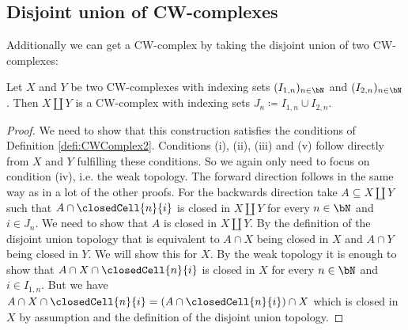 \subsection{Disjoint union of CW-complexes}

Additionally we can get a CW-complex by taking the disjoint union of two CW-complexes: 

\begin{lem}
    Let $X$ and $Y$ be two CW-complexes with indexing sets $(I_{1,n})_{n \in \bN}$ and $(I_{2, n})_{n \in \bN}$. 
    Then $X \amalg Y$ is a CW-complex with indexing sets $J_n \coloneq I_{1, n} \cup I_{2, n}$. \href{https://github.com/scholzhannah/CWComplexes/blob/7be4872a05b534011cc969eb5b80a4b7f0bf57e2/CWcomplexes/Constructions.lean#L71-L136}{\faExternalLink}
\end{lem}
\begin{proof}
    We need to show that this construction satisfies the conditions of Definition \ref{defi:CWComplex2}. 
    Conditions (i), (ii), (iii) and (v) follow directly from $X$ and $Y$ fulfilling these conditions. 
    So we again only need to focus on condition (iv), i.e. the weak topology. 
    The forward direction follows in the same way as in a lot of the other proofs.
    For the backwards direction take $A \subseteq X \amalg Y$ such that $A \cap \closedCell{n}{i}$ is closed in $X \amalg Y$ for every $n \in \bN$ and $i \in J_n$. 
    We need to show that $A$ is closed in $X \amalg Y$. 
    By the definition of the disjoint union topology that is equivalent to $A \cap X$ being closed in $X$ and $A \cap Y$ being closed in $Y$. 
    We will show this for $X$. 
    By the weak topology it is enough to show that $A \cap X \cap \closedCell{n}{i}$ is closed in $X$ for every $n \in \bN$ and $i \in I_{1, n}$. 
    But we have $A \cap X \cap \closedCell{n}{i} = (A \cap \closedCell{n}{i}) \cap X$ which is closed in $X$ by assumption and the definition of the disjoint union topology.
\end{proof}
